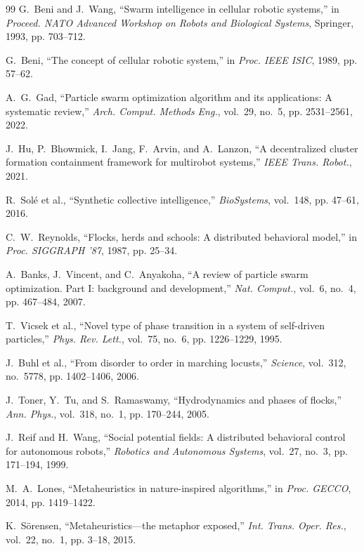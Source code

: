\documentclass[journal,compsoc]{IEEEtran}
\begin{document}
\begin{thebibliography}{99}
G.~Beni and J.~Wang, ``Swarm intelligence in cellular robotic systems,'' in \emph{Proceed. NATO Advanced Workshop on Robots and Biological Systems}, Springer, 1993, pp. 703--712.

G.~Beni, ``The concept of cellular robotic system,'' in \emph{Proc. IEEE ISIC}, 1989, pp. 57--62.

A.~G.~Gad, ``Particle swarm optimization algorithm and its applications: A systematic review,'' \emph{Arch. Comput. Methods Eng.}, vol.~29, no.~5, pp. 2531--2561, 2022.

J.~Hu, P.~Bhowmick, I.~Jang, F.~Arvin, and A.~Lanzon, ``A decentralized cluster formation containment framework for multirobot systems,'' \emph{IEEE Trans. Robot.}, 2021.

R.~Solé et al., ``Synthetic collective intelligence,'' \emph{BioSystems}, vol.~148, pp. 47--61, 2016.

C.~W.~Reynolds, ``Flocks, herds and schools: A distributed behavioral model,'' in \emph{Proc. SIGGRAPH '87}, 1987, pp. 25--34.

A.~Banks, J.~Vincent, and C.~Anyakoha, ``A review of particle swarm optimization. Part I: background and development,'' \emph{Nat. Comput.}, vol.~6, no.~4, pp. 467--484, 2007.

T.~Vicsek et al., ``Novel type of phase transition in a system of self-driven particles,'' \emph{Phys. Rev. Lett.}, vol.~75, no.~6, pp. 1226--1229, 1995.

J.~Buhl et al., ``From disorder to order in marching locusts,'' \emph{Science}, vol.~312, no.~5778, pp. 1402--1406, 2006.

J.~Toner, Y.~Tu, and S.~Ramaswamy, ``Hydrodynamics and phases of flocks,'' \emph{Ann. Phys.}, vol.~318, no.~1, pp. 170--244, 2005.

J.~Reif and H.~Wang, ``Social potential fields: A distributed behavioral control for autonomous robots,'' \emph{Robotics and Autonomous Systems}, vol.~27, no.~3, pp. 171--194, 1999.

M.~A.~Lones, ``Metaheuristics in nature-inspired algorithms,'' in \emph{Proc. GECCO}, 2014, pp. 1419--1422.

K.~Sörensen, ``Metaheuristics—the metaphor exposed,'' \emph{Int. Trans. Oper. Res.}, vol.~22, no.~1, pp. 3--18, 2015.


\end{thebibliography}
\end{document}

